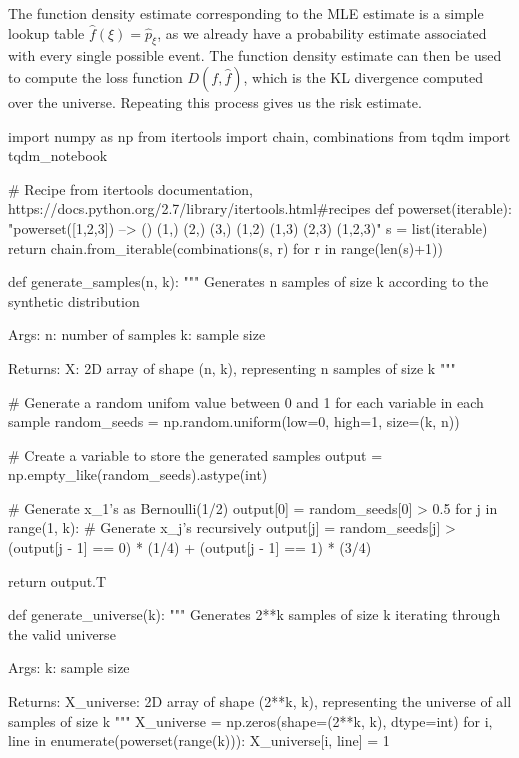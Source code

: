 The function density estimate corresponding to the MLE estimate is a
simple lookup table \(\hat{f}(\xi) = \hat{p}_\xi\), as we already have a
probability estimate associated with every single possible event. The
function density estimate can then be used to compute the loss function
\(D(f, \hat{f})\), which is the KL divergence computed over the
universe. Repeating this process gives us the risk estimate.

\begin{python}
import numpy as np
from itertools import chain, combinations
from tqdm import tqdm_notebook


# Recipe from itertools documentation, https://docs.python.org/2.7/library/itertools.html#recipes
def powerset(iterable):
    "powerset([1,2,3]) --> () (1,) (2,) (3,) (1,2) (1,3) (2,3) (1,2,3)"
    s = list(iterable)
    return chain.from_iterable(combinations(s, r) for r in range(len(s)+1))


def generate_samples(n, k):
    """
    Generates n samples of size k according to the synthetic distribution
    
    Args:
       n:  number of samples
       k:  sample size
       
    Returns:
       X:  2D array of shape (n, k), representing n samples of size k
    """
    
    # Generate a random unifom value between 0 and 1 for each variable in each sample
    random_seeds = np.random.uniform(low=0, high=1, size=(k, n))
    
    # Create a variable to store the generated samples
    output = np.empty_like(random_seeds).astype(int)
    
    # Generate x_1's as Bernoulli(1/2)
    output[0] = random_seeds[0] > 0.5
    for j in range(1, k):
        # Generate x_j's recursively
        output[j] = random_seeds[j] > (output[j - 1] == 0) * (1/4) + (output[j - 1] == 1) * (3/4)
        
    return output.T


def generate_universe(k):
    """
    Generates 2**k samples of size k iterating through the valid universe
    
    Args:
       k: sample size
       
    Returns:
       X_universe:  2D array of shape (2**k, k), representing the universe of all samples of size k
    """
    X_universe = np.zeros(shape=(2**k, k), dtype=int)
    for i, line in enumerate(powerset(range(k))):
        X_universe[i, line] = 1
        

\end{python}
